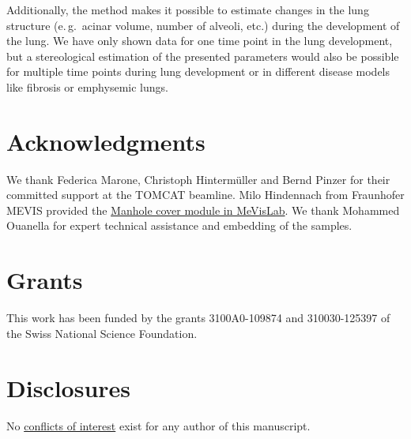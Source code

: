 \documentclass[a4paper,DIV=calc,abstract,english]{scrartcl}
\newcommand{\eg}{e.\,g.\ }
\begin{document}
Additionally, the method makes it possible to estimate changes in the lung structure (\eg acinar volume, number of alveoli, etc.) during the development of the lung.
We have only shown data for one time point in the lung development, but a stereological estimation of the presented parameters would also be possible for multiple time points during lung development or in different disease models like fibrosis or emphysemic lungs.

\section{Acknowledgments}
We thank Federica Marone, Christoph Hintermüller and Bernd Pinzer for their committed support at the TOMCAT beamline.
Milo Hindennach from Fraunhofer MEVIS provided the \href{http://www.mevis-research.de/cgi-bin/discus/board-auth.cgi?lm=1282233250&file=/839/11760.html}{Manhole cover module in MeVisLab}.
We thank Mohammed Ouanella for expert technical assistance and embedding of the samples.

\section{Grants}
This work has been funded by the grants 3100A0-109874 and 310030-125397 of the Swiss National Science Foundation.

\section{Disclosures}
No \href{http://www.the-aps.org/mm/Publications/Preparing-Your-Manuscript#conflicts}{conflicts of interest} exist for any author of this manuscript.

\ifJCS
	\singlespacing
\else
\fi



\end{document}

